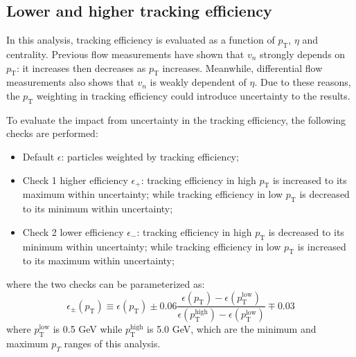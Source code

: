 \subsection{Lower and higher tracking efficiency}
In this analysis, tracking efficiency is evaluated as a function of $p_\text{T}$, $\eta$ and centrality. Previous flow measurements have shown that $v_n$ strongly depends on $p_\text{T}$: it increases then decreases as $p_\text{T}$ increases. Meanwhile, differential flow measurements also shows that $v_n$ is weakly dependent of $\eta$. Due to these reasons, the $p_\text{T}$ weighting in tracking efficiency could introduce uncertainty to the results.

To evaluate the impact from uncertainty in the tracking efficiency, the following checks are performed:
\begin{itemize}
\item Default $\epsilon$: particles weighted by tracking efficiency;
\item Check 1 higher efficiency $\epsilon_+$: tracking efficiency in high $p_\text{T}$ is increased to its maximum within uncertainty; while tracking efficiency in low $p_\text{T}$ is decreased to its minimum within uncertainty;
\item Check 2 lower efficiency $\epsilon_-$: tracking efficiency in high $p_\text{T}$ is decreased to its minimum within uncertainty; while tracking efficiency in low $p_\text{T}$ is increased to its maximum within uncertainty;
\end{itemize}
where the two checks can be parameterized as:
\begin{equation}
\epsilon_\pm(p_\text{T}) \equiv \epsilon(p_\text{T}) \pm 0.06\frac{\epsilon(p_\text{T})-\epsilon(p_\text{T}^\text{low})}{\epsilon(p_\text{T}^\text{high})-\epsilon(p_\text{T}^\text{low})} \mp 0.03
\end{equation}
where $p_\text{T}^\text{low}$ is 0.5 GeV while $p_\text{T}^\text{high}$ is 5.0 GeV, which are the minimum and maximum $p_{T}$ ranges of this analysis.

